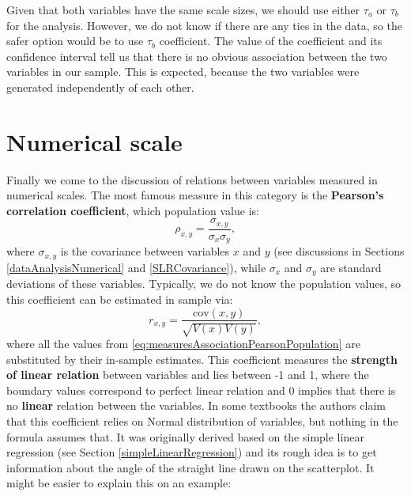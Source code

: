 \documentclass[
]{book}
\newenvironment{Shaded}{\begin{snugshade}}{\end{snugshade}}
\newcommand{\AttributeTok}[1]{\textcolor[rgb]{0.13,0.29,0.53}{#1}}
\newcommand{\FunctionTok}[1]{\textcolor[rgb]{0.13,0.29,0.53}{\textbf{#1}}}
\newcommand{\NormalTok}[1]{#1}
\newcommand{\SpecialCharTok}[1]{\textcolor[rgb]{0.81,0.36,0.00}{\textbf{#1}}}
\newcommand{\StringTok}[1]{\textcolor[rgb]{0.31,0.60,0.02}{#1}}
\theoremstyle{definition}
\theoremstyle{definition}
\theoremstyle{definition}
\theoremstyle{definition}
\theoremstyle{remark}
\begin{document}
Given that both variables have the same scale sizes, we should use either \(\tau_a\) or \(\tau_b\) for the analysis. However, we do not know if there are any ties in the data, so the safer option would be to use \(\tau_b\) coefficient. The value of the coefficient and its confidence interval tell us that there is no obvious association between the two variables in our sample. This is expected, because the two variables were generated independently of each other.

\section{Numerical scale}\label{correlationCoefficient}

Finally we come to the discussion of relations between variables measured in numerical scales. The most famous measure in this category is the \textbf{Pearson's correlation coefficient}, which population value is:
\begin{equation}
    \rho_{x,y} = \frac{\sigma_{x,y}}{\sigma_x \sigma_y},
    \label{eq:measuresAssociationPearsonPopulation}
\end{equation}
where \(\sigma_{x,y}\) is the covariance between variables \(x\) and \(y\) (see discussions in Sections \ref{dataAnalysisNumerical} and \ref{SLRCovariance}), while \(\sigma_x\) and \(\sigma_y\) are standard deviations of these variables. Typically, we do not know the population values, so this coefficient can be estimated in sample via:
\begin{equation}
    r_{x,y} = \frac{\mathrm{cov}(x,y)}{\sqrt{V(x)V(y)}},
    \label{eq:measuresAssociationPearson}
\end{equation}
where all the values from \eqref{eq:measuresAssociationPearsonPopulation} are substituted by their in-sample estimates. This coefficient measures the \textbf{strength of linear relation} between variables and lies between -1 and 1, where the boundary values correspond to perfect linear relation and 0 implies that there is no \textbf{linear} relation between the variables. In some textbooks the authors claim that this coefficient relies on Normal distribution of variables, but nothing in the formula assumes that. It was originally derived based on the simple linear regression (see Section \ref{simpleLinearRegression}) and its rough idea is to get information about the angle of the straight line drawn on the scatterplot. It might be easier to explain this on an example:

\begin{Shaded}
\end{Shaded}
\end{document}
